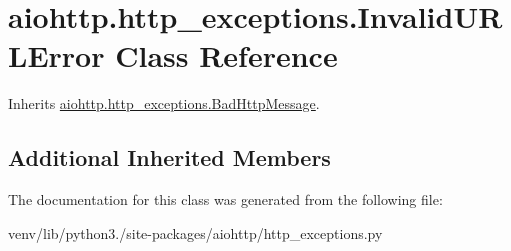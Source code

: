 \hypertarget{classaiohttp_1_1http__exceptions_1_1_invalid_u_r_l_error}{}\section{aiohttp.\+http\+\_\+exceptions.\+Invalid\+U\+R\+L\+Error Class Reference}
\label{classaiohttp_1_1http__exceptions_1_1_invalid_u_r_l_error}


Inherits \hyperlink{classaiohttp_1_1http__exceptions_1_1_bad_http_message}{aiohttp.\+http\+\_\+exceptions.\+Bad\+Http\+Message}.

\subsection*{Additional Inherited Members}


The documentation for this class was generated from the following file\+:\begin{DoxyCompactItemize}
\item 
venv/lib/python3./site-\/packages/aiohttp/http\+\_\+exceptions.\+py\end{DoxyCompactItemize}
